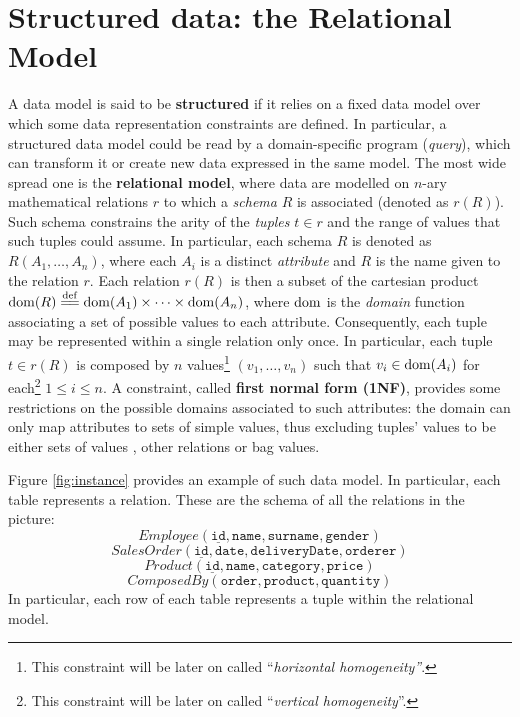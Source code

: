 
\section{Structured data: the Relational Model}\label{sec:relationalcmp}
A data model is said to be \textbf{structured} if it relies on a fixed data model over which some data representation constraints are defined.
In particular, a structured data model could be read by a domain-specific program (\textit{query}), which can transform it or create new data expressed in the same model. The most wide spread one is the \textbf{relational model}, where data are modelled on $n$-ary mathematical relations $r$ \cite{RelGraph} to which a \textit{schema} $R$ is associated (denoted as $r(R)$). Such schema constrains the arity of the \textit{tuples} $t\in r$  and the range of values that such tuples could assume. In particular, each schema $R$ is denoted as $R(A_1,\dots,A_n)$, where each $A_i$ is a distinct \textit{attribute} and $R$ is the name given to the relation $r$. Each relation $r(R)$ is then a subset of the cartesian product $\operatorname{dom}(R)\overset{\mathrm{def}}{=\mathrel{\mkern-3mu}=}\operatorname{dom}(A_1)\times\dots\times \operatorname{dom}(A_n)$, where $\operatorname{dom}$ is the \textit{domain} function associating a set of possible values to each attribute. Consequently, each tuple may be represented within a single relation only once. In particular, each tuple $t\in r(R)$ is composed by $n$ values\footnote{This constraint will be later on called ``\textit{horizontal homogeneity''}.} $(v_1,\dots,v_n)$ such that $v_i\in \operatorname{dom}(A_i)$ for each\footnote{This constraint will be later on called ``\textit{vertical homogeneity}''.} $1\leq i\leq n$. A constraint, called \textbf{first normal form (1NF)}, provides some restrictions on the possible domains associated to such attributes: the domain  can only map attributes to sets of simple values, thus excluding tuples' values to be either sets of values \cite{Codd71a}, other relations \cite{Elmasri} or bag values.

\begin{example}
Figure \ref{fig:instance} provides an example of such data model. In particular, each table represents a relation. These are the schema of all the relations in the picture:
\[Employee(\underline{\texttt{id}},\texttt{name},\texttt{surname},\texttt{gender})\]
\[SalesOrder(\underline{\texttt{id}},\texttt{date},\texttt{deliveryDate},\texttt{orderer})\]
\[Product(\underline{\texttt{id}},\texttt{name},\texttt{category},\texttt{price})\]
\[ComposedBy(\texttt{order},\texttt{product},\texttt{quantity})\]
In particular, each row of each table represents a tuple within the relational model. 
\end{example}

